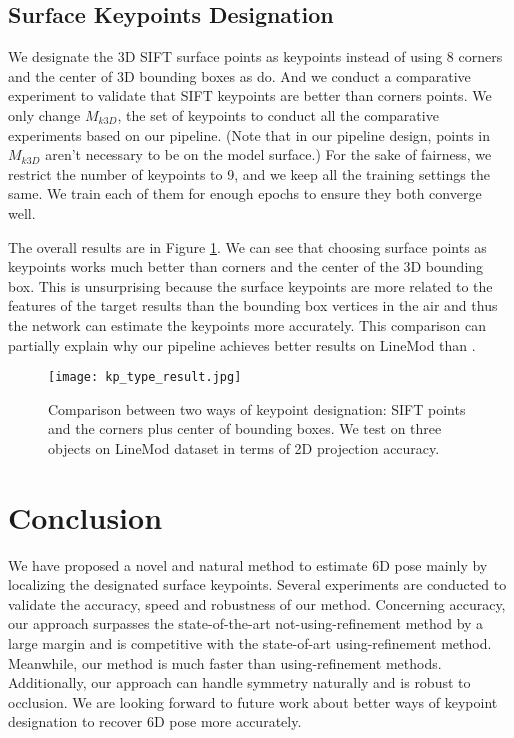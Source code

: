 \documentclass[10pt,twocolumn,letterpaper]{article}
\begin{document}
\subsection{Surface Keypoints Designation}
\label{sec:choosing keypoints}
We designate the 3D SIFT surface points as keypoints instead of using 8 corners and the center of 3D bounding boxes as \cite{Rad2017BB8AS,tekin18} do. And we conduct a comparative experiment to validate that SIFT keypoints are better than corners points. We only change $M_{k3D}$, the set of keypoints to conduct all the comparative experiments based on our pipeline. (Note that in our pipeline design, points in $M_{k3D}$ aren't necessary to be on the model surface.) For the sake of fairness, we restrict the number of keypoints to 9, and we keep all the training settings the same. We train each of them for enough epochs to ensure they both converge well.

The overall results are in Figure \ref{fig:diff_ways}. We can see that choosing surface points as keypoints works much better than corners and the center of the 3D bounding box. This is unsurprising because the surface keypoints are more related to the features of the target results than the bounding box vertices in the air and thus the network can estimate the keypoints more accurately. This comparison can partially explain why our pipeline achieves better results on LineMod than \cite{Rad2017BB8AS,tekin18}.

\begin{figure}[t]
\begin{center}
   \texttt{[image: kp\_type\_result.jpg]}
\end{center}
   \caption{Comparison between two ways of keypoint designation: SIFT points and the corners plus center of bounding boxes. We test on three objects on LineMod dataset in terms of 2D projection accuracy.}
\label{fig:diff_ways}
\end{figure}

\section{Conclusion}
We have proposed a novel and natural method to estimate 6D pose mainly by localizing the designated surface keypoints. Several experiments are conducted to validate the accuracy, speed and robustness of our method. Concerning accuracy, our approach surpasses the state-of-the-art not-using-refinement method by a large margin and is competitive with the state-of-art using-refinement method. Meanwhile, our method is much faster than using-refinement methods. Additionally, our approach can handle symmetry naturally and is robust to occlusion. We are looking forward to future work about better ways of keypoint designation to recover 6D pose more accurately.





{\small


}
\end{document}
